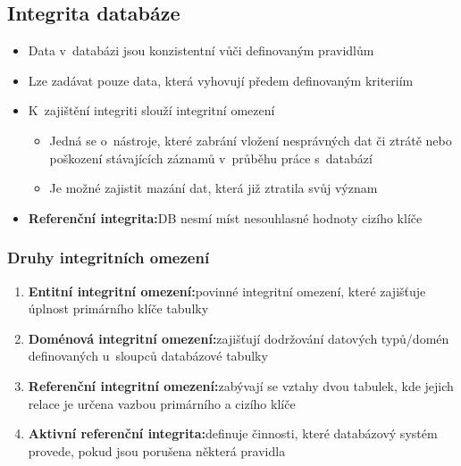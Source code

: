 \documentclass[a4paper,10pt]{article}
\newcommand{\pojem}[2]{\item \textbf{#1:}\quad #2}
\begin{document}
		\subsection{Integrita databáze}
			\begin{itemize} 
				\item Data v~databázi jsou konzistentní vůči definovaným pravidlům
				\item Lze zadávat pouze data, která vyhovují předem definovaným kriteriím
				\item K~zajištění integriti slouží integritní omezení
				\begin{itemize}
					\item Jedná se o~nástroje, které zabrání vložení nesprávných dat či ztrátě nebo poškození stávajících záznamů v~průběhu práce s~databází
					\item Je možné zajistit mazání dat, která již ztratila svůj význam 
				\end{itemize}
				\pojem{Referenční integrita}{DB nesmí míst nesouhlasné hodnoty cizího klíče}		
			\end{itemize}
			
			\subsubsection{Druhy integritních omezení}
				\begin{enumerate}
					\pojem{Entitní integritní omezení}{povinné integritní omezení, které zajišťuje úplnost primárního klíče tabulky}
					\pojem{Doménová integritní omezení}{zajišťují dodržování datových typů/domén definovaných u~sloupců databázové tabulky}
					\pojem{Referenční integritní omezení}{zabývají se vztahy dvou tabulek, kde jejich relace je určena vazbou primárního a cizího klíče}
					\pojem{Aktivní referenční integrita}{definuje činnosti, které databázový systém provede, pokud jsou porušena některá pravidla}
				\end{enumerate}
\end{document}
